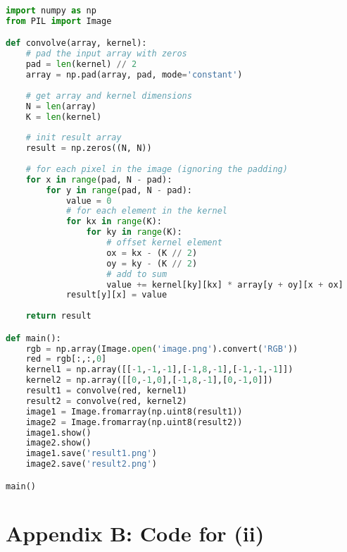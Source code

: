 \documentclass[12pt]{article}
\begin{document}
\lstset{basicstyle=\footnotesize}
\begin{lstlisting}[language=Python]
import numpy as np
from PIL import Image

def convolve(array, kernel):
    # pad the input array with zeros
    pad = len(kernel) // 2
    array = np.pad(array, pad, mode='constant')
    
    # get array and kernel dimensions
    N = len(array)
    K = len(kernel)
    
    # init result array
    result = np.zeros((N, N))
    
    # for each pixel in the image (ignoring the padding)
    for x in range(pad, N - pad):
        for y in range(pad, N - pad):
            value = 0
            # for each element in the kernel
            for kx in range(K):
                for ky in range(K):
                    # offset kernel element
                    ox = kx - (K // 2)
                    oy = ky - (K // 2)
                    # add to sum
                    value += kernel[ky][kx] * array[y + oy][x + ox]
            result[y][x] = value
    
    return result

def main():
    rgb = np.array(Image.open('image.png').convert('RGB'))
    red = rgb[:,:,0]
    kernel1 = np.array([[-1,-1,-1],[-1,8,-1],[-1,-1,-1]])
    kernel2 = np.array([[0,-1,0],[-1,8,-1],[0,-1,0]])
    result1 = convolve(red, kernel1)
    result2 = convolve(red, kernel2)
    image1 = Image.fromarray(np.uint8(result1))
    image2 = Image.fromarray(np.uint8(result2))
    image1.show()
    image2.show()
    image1.save('result1.png')
    image2.save('result2.png')

main()
\end{lstlisting}

\section*{Appendix B: Code for (ii)}
\end{document}
